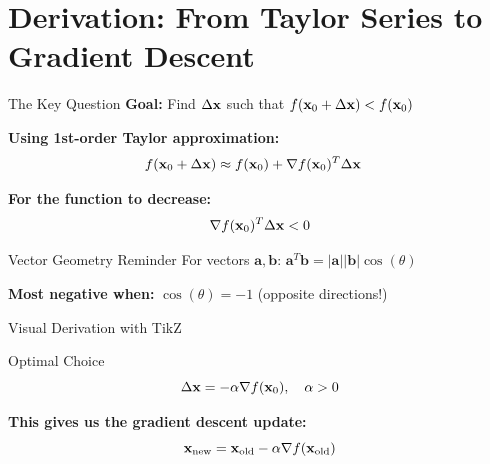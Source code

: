 \documentclass[usenames,dvipsnames]{beamer}
\begin{document}
  \section{Derivation: From Taylor Series to Gradient Descent}

  \begin{frame}{The Key Question}
    \textbf{Goal:} Find $\Delta \mathbf{x}$ such that $f(\mathbf{x}_0 + \Delta \mathbf{x}) < f(\mathbf{x}_0)$
    
    \pause
    \textbf{Using 1st-order Taylor approximation:}
    \begin{align}
        f(\mathbf{x}_0 + \Delta \mathbf{x}) &\approx f(\mathbf{x}_0) + \nabla f(\mathbf{x}_0)^T \Delta \mathbf{x}
    \end{align}
    
    \pause
    \textbf{For the function to decrease:}
    $$\nabla f(\mathbf{x}_0)^T \Delta \mathbf{x} < 0$$
    
    \pause
    \begin{alertbox}{Vector Geometry Reminder}
    For vectors $\mathbf{a}, \mathbf{b}$: $\mathbf{a}^T\mathbf{b} = |\mathbf{a}||\mathbf{b}|\cos(\theta)$
    
    \textbf{Most negative when:} $\cos(\theta) = -1$ (opposite directions!)
    \end{alertbox}
  \end{frame}

  \begin{frame}{Visual Derivation with TikZ}
    \begin{center}
    \end{center}
    
    \pause
    \begin{definitionbox}{Optimal Choice}
    $$\Delta \mathbf{x} = -\alpha \nabla f(\mathbf{x}_0), \quad \alpha > 0$$
    \end{definitionbox}
    
    \pause
    \textbf{This gives us the gradient descent update:}
    $$\mathbf{x}_{\text{new}} = \mathbf{x}_{\text{old}} - \alpha \nabla f(\mathbf{x}_{\text{old}})$$
  \end{frame}
\end{document}
